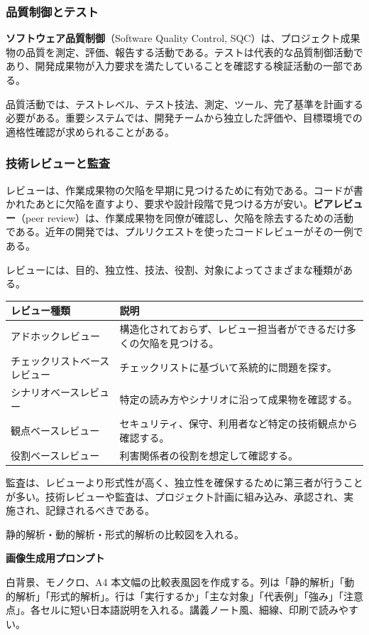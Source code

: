\documentclass[11pt,a4paper]{article}
\newcommand{\term}[2]{\textbf{#1}（#2）}
\begin{document}
\subsubsection{品質制御とテスト}
\term{ソフトウェア品質制御}{Software Quality Control, SQC}は、プロジェクト成果物の品質を測定、評価、報告する活動である。テストは代表的な品質制御活動であり、開発成果物が入力要求を満たしていることを確認する検証活動の一部である。

品質活動では、テストレベル、テスト技法、測定、ツール、完了基準を計画する必要がある。重要システムでは、開発チームから独立した評価や、目標環境での適格性確認が求められることがある。

\subsubsection{技術レビューと監査}
レビューは、作業成果物の欠陥を早期に見つけるために有効である。コードが書かれたあとに欠陥を直すより、要求や設計段階で見つける方が安い。\term{ピアレビュー}{peer review}は、作業成果物を同僚が確認し、欠陥を除去するための活動である。近年の開発では、プルリクエストを使ったコードレビューがその一例である。

レビューには、目的、独立性、技法、役割、対象によってさまざまな種類がある。


\noindent\begin{tabularx}{\textwidth}{L{0.25\textwidth}Y}
\toprule
\textbf{レビュー種類} & \textbf{説明} \\
\midrule
アドホックレビュー & 構造化されておらず、レビュー担当者ができるだけ多くの欠陥を見つける。 \\
チェックリストベースレビュー & チェックリストに基づいて系統的に問題を探す。 \\
シナリオベースレビュー & 特定の読み方やシナリオに沿って成果物を確認する。 \\
観点ベースレビュー & セキュリティ、保守、利用者など特定の技術観点から確認する。 \\
役割ベースレビュー & 利害関係者の役割を想定して確認する。 \\
\bottomrule
\end{tabularx}


監査は、レビューより形式性が高く、独立性を確保するために第三者が行うことが多い。技術レビューや監査は、プロジェクト計画に組み込み、承認され、実施され、記録されるべきである。

\begin{todobox}
静的解析・動的解析・形式的解析の比較図を入れる。\par
\textbf{画像生成用プロンプト}\par
白背景、モノクロ、A4 本文幅の比較表風図を作成する。列は「静的解析」「動的解析」「形式的解析」。行は「実行するか」「主な対象」「代表例」「強み」「注意点」。各セルに短い日本語説明を入れる。講義ノート風、細線、印刷で読みやすい。
\end{todobox}
\end{document}
